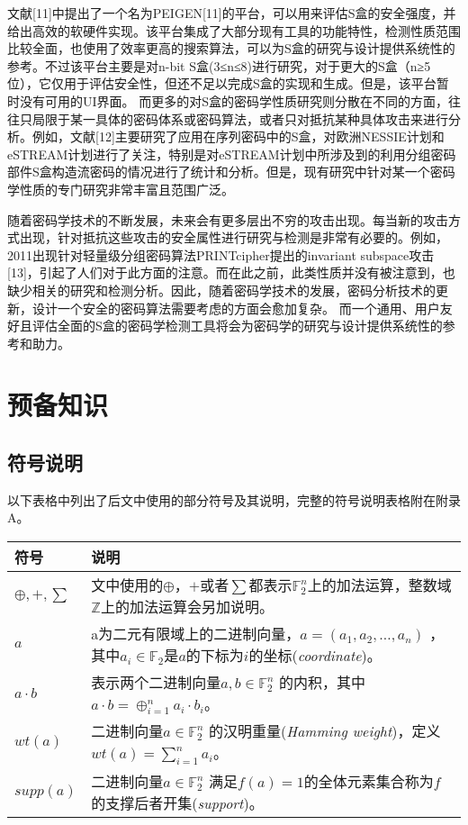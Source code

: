\documentclass{xduugthesis}
\begin{document}
文献[11]中提出了一个名为PEIGEN[11]的平台，可以用来评估S盒的安全强度，并给出高效的软硬件实现。该平台集成了大部分现有工具的功能特性，检测性质范围比较全面，也使用了效率更高的搜索算法，可以为S盒的研究与设计提供系统性的参考。不过该平台主要是对n-bit S盒(3≤n≤8)进行研究，对于更大的S盒（n≥5位），它仅用于评估安全性，但还不足以完成S盒的实现和生成。但是，该平台暂时没有可用的UI界面。
而更多的对S盒的密码学性质研究则分散在不同的方面，往往只局限于某一具体的密码体系或密码算法，或者只对抵抗某种具体攻击来进行分析。例如，文献[12]主要研究了应用在序列密码中的S盒，对欧洲NESSIE计划和eSTREAM计划进行了关注，特别是对eSTREAM计划中所涉及到的利用分组密码部件S盒构造流密码的情况进行了统计和分析。但是，现有研究中针对某一个密码学性质的专门研究非常丰富且范围广泛。\par

随着密码学技术的不断发展，未来会有更多层出不穷的攻击出现。每当新的攻击方式出现，针对抵抗这些攻击的安全属性进行研究与检测是非常有必要的。例如，2011出现针对轻量级分组密码算法PRINTcipher提出的invariant subspace攻击[13]，引起了人们对于此方面的注意。而在此之前，此类性质并没有被注意到，也缺少相关的研究和检测分析。因此，随着密码学技术的发展，密码分析技术的更新，设计一个安全的密码算法需要考虑的方面会愈加复杂。
而一个通用、用户友好且评估全面的S盒的密码学检测工具将会为密码学的研究与设计提供系统性的参考和助力。


\chapter{预备知识}
\section{符号说明}
以下表格中列出了后文中使用的部分符号及其说明，完整的符号说明表格附在附录A。\par
\begin{tabular}{|p{3cm}|p{11cm}|}
\hline
符号& 说明\\
\hline
$\oplus,+,\sum $ & 文中使用的$\oplus$，$+$或者$\sum$都表示$\mathbb{F}_2^n$上的加法运算，整数域$\mathbb{Z}$上的加法运算会另加说明。\\
\hline
$a$ & a为二元有限域上的二进制向量，$a=(a_1,a_2,\dots ,a_n)$ ，其中$a_i \in \mathbb{F}_2$是$a$的下标为$i$的坐标(\emph{coordinate})。\\
\hline
$a \cdot b$ & 表示两个二进制向量$a,b \in \mathbb{F}_2^n$ 的内积，其中$a \cdot b = \oplus _{i=1}^n a_i \cdot b_i$。\\
\hline
$wt(a)$ & 二进制向量$a \in \mathbb{F}_2^n$ 的汉明重量(\emph{Hamming weight})，定义$wt(a)=\sum_{i=1}^n a_i $。\\
\hline
$supp(a)$ & 二进制向量$a\in \mathbb{F}_2^n$ 满足$f(a)=1$的全体元素集合称为$f$的支撑后者开集(\emph{support})。\\
\hline
\end{tabular}\par
\end{document}
